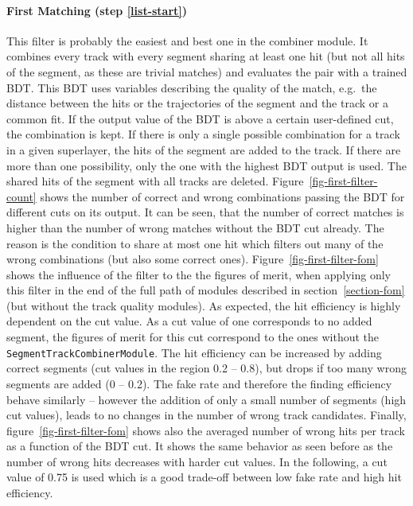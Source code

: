 \paragraph{First Matching (step \ref{list-start})}
This filter is probably the easiest and best one in the combiner module. It combines every track with every segment sharing at least one hit (but not all hits of the segment, as these are trivial matches) and evaluates the pair with a trained BDT. This BDT uses variables describing the quality of the match, e.g.\ the distance between the hits or the trajectories of the segment and the track or a common fit. If the output value of the BDT is above a certain user-defined cut, the combination is kept. If there is only a single possible combination for a track in a given superlayer, the hits of the segment are added to the track. If there are more than one possibility, only the one with the highest BDT output is used. The shared hits of the segment with all tracks are deleted. Figure~\ref{fig-first-filter-count} shows the number of correct and wrong combinations passing the BDT for different cuts on its output. It can be seen, that the number of correct matches is higher than the number of wrong matches without the BDT cut already. The reason is the condition to share at most one hit which filters out many of the wrong combinations (but also some correct ones). Figure~\ref{fig-first-filter-fom} shows the influence of the filter to the the figures of merit, when applying only this  filter in the end of the full path of modules described in section~\ref{section-fom} (but without the track quality modules). As expected, the hit efficiency is highly dependent on the cut value. As a cut value of one corresponds to no added segment, the figures of merit for this cut correspond to the ones without the \texttt{SegmentTrackCombinerModule}. The hit efficiency can be increased by adding correct segments (cut values in the region 0.2 -- 0.8), but drops if too many wrong segments are added (0 -- 0.2). The fake rate and therefore the finding efficiency behave similarly -- however the addition of only a small number of segments (high cut values), leads to no changes in the number of wrong track candidates. Finally, figure~\ref{fig-first-filter-fom} shows also the averaged number of wrong hits per track as a function of the BDT cut. It shows the same behavior as seen before as the number of wrong hits decreases with harder cut values. In the following, a cut value of 0.75 is used which is a good trade-off between low fake rate and high hit efficiency.

